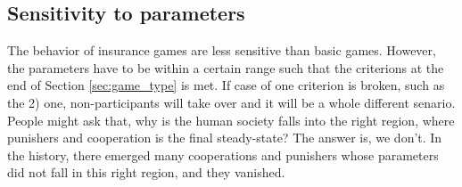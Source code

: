 \documentclass[11pt]{article}
\begin{document}
\subsection{Sensitivity to parameters}
The behavior of insurance games are less sensitive than basic games. However, the parameters have to be within a certain range such that the criterions at the end of Section \ref{sec:game_type} is met. If case of one criterion is broken, such as the 2) one, non-participants will take over and it will be a whole different senario. People might ask that, why is the human society falls into the right region, where punishers and cooperation is the final steady-state? The answer is, we don't. In the history, there emerged many cooperations and punishers whose parameters did not fall in this right region, and they vanished. 
\end{document}
